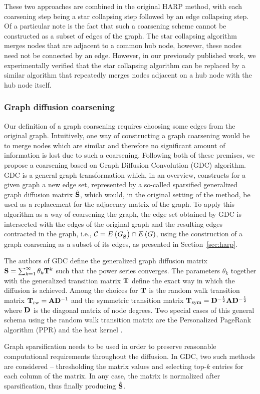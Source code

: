 These two approaches are combined in the original HARP method, with each coarsening step being a star collapsing step followed by an edge collapsing step. Of a particular note is the fact that such a coarsening scheme cannot be constructed as a subset of edges of the graph. The star collapsing algorithm merges nodes that are adjacent to a common hub node, however, these nodes need not be connected by an edge. However, in our previously published work, we experimentally verified that the star collapsing algorithm can be replaced by a similar algorithm that repeatedly merges nodes adjacent on a hub node with the hub node itself.

\subsubsection{Graph diffusion coarsening}\label{sec:gdc-coarsening}

Our definition of a graph coarsening requires choosing some edges from the original graph. Intuitively, one way of constructing a graph coarsening would be to merge nodes which are similar and therefore no significant amount of information is lost due to such a coarsening. Following both of these premises, we propose a coarsening based on Graph Diffusion Convolution (GDC) \cite{gasteiger_diffusion_2019} algorithm. GDC is a general graph transformation which, in an overview, constructs for a given graph a new edge set, represented by a so-called sparsified generalized graph diffusion matrix \( \hat{\mathbf{S}} \), which would, in the original setting of the method, be used as a replacement for the adjacency matrix of the graph. To apply this algorithm as a way of coarsening the graph, the edge set obtained by GDC is intersected with the edges of the original graph and the resulting edges contracted in the graph, i.e., \( \mathcal{C} = E \left( G_{\hat{\mathbf{S}}} \right) \cap E \left( G \right) \), using the construction of a graph coarsening as a subset of its edges, as presented in Section~\ref{sec:harp}.

The authors of GDC define the generalized graph diffusion matrix \( \mathbf{S} = \sum_{k = 1}^\infty \theta_k \mathbf{T}^k \) such that the power series converges. The parameters \( \theta_k \) together with the generalized transition matrix \( \mathbf{T} \) define the exact way in which the diffusion is achieved. Among the choices for \( \mathbf{T} \) is the random walk transition matrix \( \mathbf{T}_ \mathrm{rw} = \mathbf{A} \mathbf{D}^{-1} \) and the symmetric transition matrix \( \mathbf{T}_\mathrm{sym} = \mathbf{D}^{-\frac{1}{2}} \mathbf{A} \mathbf{D}^{-\frac{1}{2}} \) where \( \mathbf{D} \) is the diagonal matrix of node degrees. Two special cases of this general schema using the random walk transition matrix are the Personalized PageRank algorithm (PPR) \cite{page_pagerank_1999} and the heat kernel \cite{kondor_diffusion_2002}.

Graph sparsification needs to be used in order to preserve reasonable computational requirements throughout the diffusion. In GDC, two such methods are considered -- thresholding the matrix values and selecting top-\( k \) entries for each column of the matrix. In any case, the matrix is normalized after sparsification, thus finally producing \( \hat{\mathbf{S}} \).
